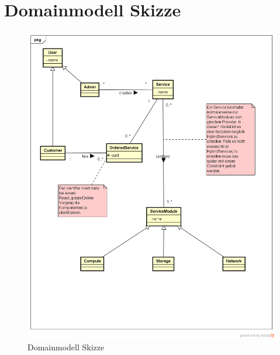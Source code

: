 \section{Domainmodell Skizze}
\begin{figure}[!htbp]
\includegraphics[width=\textwidth]{./03_Analyse/05_DomainModel/images/SDDC-DomainModel}
\caption{Domainmodell Skizze}
\end{figure}